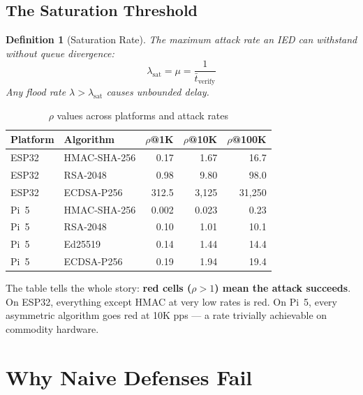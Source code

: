 \documentclass[11pt,a4paper,twocolumn]{article}
\newtheorem{definition}{Definition}
\begin{document}
\subsection{The Saturation Threshold}

\begin{definition}[Saturation Rate]
The maximum attack rate an IED can withstand without queue divergence:
\begin{equation}
\boxed{\lambda_{\text{sat}} = \mu = \frac{1}{\bar{t}_{\text{verify}}}}
\end{equation}
Any flood rate $\lambda > \lambda_{\text{sat}}$ causes unbounded delay.
\end{definition}

\begin{table}[H]
\centering
\caption{$\rho$ values across platforms and attack rates}
\label{tab:rho_matrix}
\scriptsize
\begin{tabular}{@{}llrrr@{}}
\toprule
\textbf{Platform} & \textbf{Algorithm} & \textbf{$\rho$@1K} & \textbf{$\rho$@10K} & \textbf{$\rho$@100K} \\
\midrule
ESP32 & HMAC-SHA-256 & 0.17 & 1.67 & 16.7 \\
ESP32 & RSA-2048 & 0.98 & 9.80 & 98.0 \\
ESP32 & ECDSA-P256 & 312.5 & 3{,}125 & 31{,}250 \\
\midrule
Pi~5 & HMAC-SHA-256 & 0.002 & 0.023 & 0.23 \\
Pi~5 & RSA-2048 & 0.10 & 1.01 & 10.1 \\
Pi~5 & Ed25519 & 0.14 & 1.44 & 14.4 \\
Pi~5 & ECDSA-P256 & 0.19 & 1.94 & 19.4 \\
\bottomrule
\end{tabular}
\end{table}

\begin{keyinsight}
The table tells the whole story: \textbf{red cells ($\rho > 1$) mean the attack succeeds}. On ESP32, everything except HMAC at very low rates is red. On Pi~5, every asymmetric algorithm goes red at 10K pps --- a rate trivially achievable on commodity hardware.
\end{keyinsight}

\section{Why Naive Defenses Fail}
\label{sec:naive}
\end{document}
